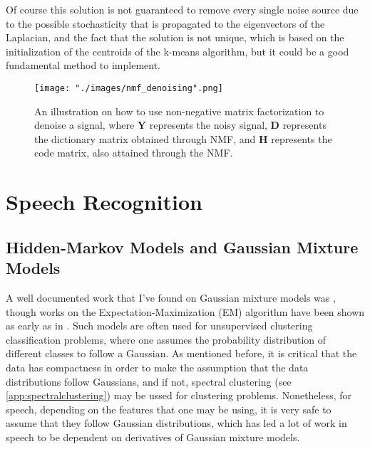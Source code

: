 Of course this solution is not guaranteed to remove every single noise source due to the possible stochasticity that is propagated to the eigenvectors of the Laplacian, and the fact that the solution is not unique, which is based on the initialization of the centroids of the k-means algorithm, but it could be a good fundamental method to implement.

\begin{figure}[ht]
\begin{center}
    \texttt{[image: "./images/nmf\_denoising".png]}
    \caption{An illustration on how to use non-negative matrix factorization to denoise a signal, where $\bm{Y}$ represents the noisy signal, $\bm{D}$ represents the dictionary matrix obtained through NMF, and $\bm{H}$ represents the code matrix, also attained through the NMF. }
    \label{fig::nmf_denoising}
\end{center}
\end{figure}

\section{Speech Recognition}
\subsection{Hidden-Markov Models and Gaussian Mixture Models} \label{sec:hmm}
A well documented work that I've found on Gaussian mixture models was \cite{GMM1}, though works on the Expectation-Maximization (EM) algorithm have been shown as early as in \cite{dudaHart1973}. Such models are often used for unsupervised clustering classification problems, where one assumes the probability distribution of different classes to follow a Gaussian. As mentioned before, it is critical that the data has compactness in order to make the assumption that the data distributions follow Gaussians, and if not, spectral clustering (see \ref{app:spectralclustering}) may be ussed for clustering problems. Nonetheless, for speech, depending on the features that one may be using, it is very safe to assume that they follow Gaussian distributions, which has led a lot of work in speech to be dependent on derivatives of Gaussian mixture models. %

